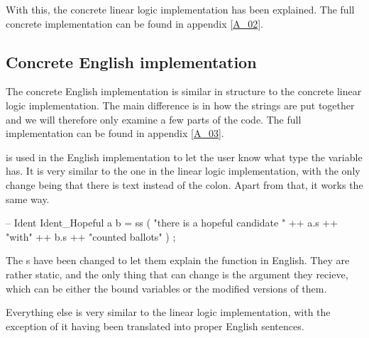 With this, the concrete linear logic implementation has been explained. The full concrete implementation can be found in appendix \ref{A_02}.

\subsection{Concrete English implementation}
\label{04_02_02}

The concrete English implementation is similar in structure to the concrete linear logic implementation. The main difference is in how the strings are put together and we will therefore only examine a few parts of the code. The full implementation can be found in appendix \ref{A_03}.


 is used in the English implementation to let the user know what type the variable has. It is very similar to the one in the linear logic implementation, with the only change being that there is text instead of the colon. Apart from that, it works the same way.

\begin{lstgf}
        -- Ident
        Ident_Hopeful a b
            = ss ( "there is a hopeful candidate " ++ a.s ++ "with" ++ b.s ++ "counted ballots" ) ;
\end{lstgf}

The s have been changed to let them explain the function in English. They are rather static, and the only thing that can change is the argument they recieve, which can be either the bound variables or the modified versions of them.

Everything else is very similar to the linear logic implementation, with the exception of it having been translated into proper English sentences.

\\
